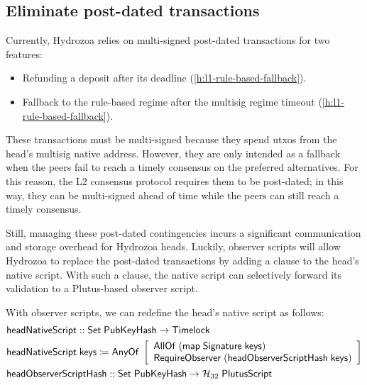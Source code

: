 \documentclass[../hydrozoa.tex]{subfiles}
\begin{document}
\subsection{Eliminate post-dated transactions}%
\label{h:observer-script-eliminate-post-dated-txs}%

Currently, Hydrozoa relies on multi-signed post-dated transactions for two features:
\begin{itemize}
  \item Refunding a deposit after its deadline (\cref{h:l1-rule-based-fallback}).
  \item Fallback to the rule-based regime after the multisig regime timeout (\cref{h:l1-rule-based-fallback}).
\end{itemize}
These transactions must be multi-signed because they spend utxos from the head's multisig native address.
However, they are only intended as a fallback when the peers fail to reach a timely consensus on the preferred alternatives. For this reason, the L2 consensus protocol requires them to be post-dated; in this way, they can be multi-signed ahead of time while the peers can still reach a timely consensus.

Still, managing these post-dated contingencies incurs a significant communication and storage overhead for Hydrozoa heads.
Luckily, observer scripts will allow Hydrozoa to replace the post-dated transactions by adding a  clause to the head's native script.
With such a clause, the native script can selectively forward its validation to a Plutus-based observer script.

With observer scripts, we can redefine the head's native script as follows:
\begin{equation*}
\begin{split}
  &\mathsf{headNativeScript} :: \mathsf{Set} \; \mathsf{PubKeyHash} -> \mathsf{Timelock} \\
  &\mathsf{headNativeScript} \; \mathsf{keys} \coloneq
    \mathsf{AnyOf} \; \left[
    \begin{array}{l}
      \mathsf{AllOf} \; (\mathsf{map} \; \mathsf{Signature} \; \mathsf{keys}) \\
      \mathsf{RequireObserver} \; (\mathsf{headObserverScriptHash \; \mathsf{keys}})
    \end{array}\right] \\
  &\mathsf{headObserverScriptHash} ::
      \mathsf{Set} \; \mathsf{PubKeyHash} -> \mathcal{H}_{32} \; \mathsf{PlutusScript}
\end{split}
\end{equation*}
\end{document}
